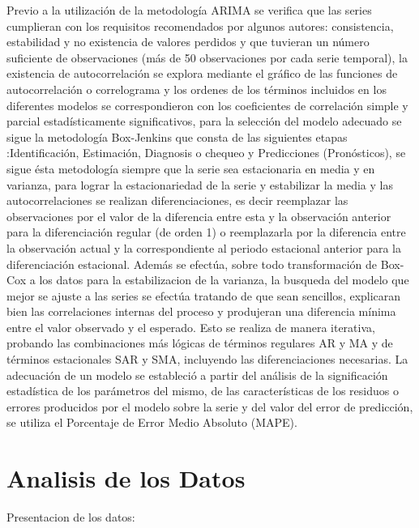 \documentclass[12pt,letterpaper]{report}
\begin{document}
Previo a la utilización de la metodología
ARIMA se verifica que las series cumplieran con los requisitos recomendados por algunos autores: consistencia, estabilidad y no existencia de valores
perdidos y que tuvieran un número suficiente de observaciones (más de 50
observaciones por cada serie temporal), la existencia de autocorrelación se
explora mediante el gráfico de las funciones de autocorrelación o correlograma y los ordenes de los términos incluidos en los diferentes modelos se correspondieron con los coeficientes de correlación simple y parcial estadísticamente
significativos, para la selección del modelo adecuado se sigue la metodología
Box-Jenkins que consta de las siguientes etapas :Identificación, Estimación,
Diagnosis o chequeo y Predicciones (Pronósticos), se sigue ésta metodología
siempre que la serie sea estacionaria en media y en varianza, para lograr la
estacionariedad de la serie y estabilizar la media y las autocorrelaciones se
realizan diferenciaciones, es decir reemplazar las observaciones por el valor de
la diferencia entre esta y la observación anterior para la diferenciación regular
(de orden 1) o reemplazarla por la diferencia entre la observación actual y la
correspondiente al periodo estacional anterior para la diferenciación estacional. Además se efectúa, sobre todo transformación de Box-Cox a los datos
para la estabilizacion de la varianza, la busqueda del modelo que mejor se
ajuste a las series se efectúa tratando de que sean sencillos, explicaran bien
las correlaciones internas del proceso y produjeran una diferencia mínima
entre el valor observado y el esperado. Esto se realiza de manera iterativa,
probando las combinaciones más lógicas de términos regulares AR y MA y
de términos estacionales SAR y SMA, incluyendo las diferenciaciones necesarias. La adecuación de un modelo se estableció a partir del análisis de la
significación estadística de los parámetros del mismo, de las características
de los residuos o errores producidos por el modelo sobre la serie y del valor del error de predicción, se utiliza el Porcentaje de Error Medio Absoluto
(MAPE).
\chapter{Analisis de los Datos}
Presentacion de los datos:
\end{document}
